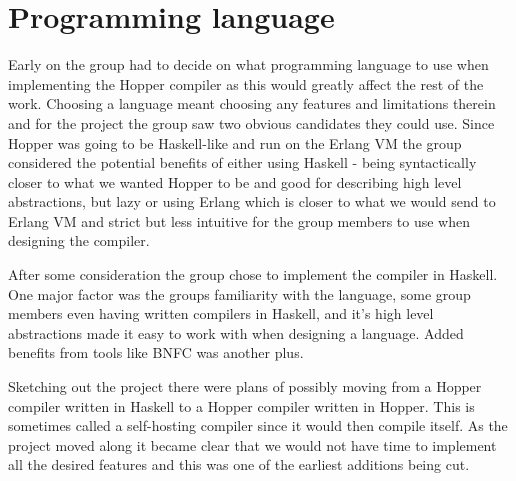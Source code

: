 \section{Programming language}




Early on the group had to decide on what programming language to use when implementing the Hopper compiler as this would greatly affect the rest of the work. Choosing a language meant choosing any features and limitations therein and for the project the group saw two obvious candidates they could use. Since Hopper was going to be Haskell-like and run on the Erlang VM the group considered the potential benefits of either using Haskell - being syntactically closer to what we wanted Hopper to be and good for describing high level abstractions, but lazy or using Erlang which is closer to what we would send to Erlang VM and strict but less intuitive for the group members to use when designing the compiler.


After some consideration the group chose to implement the compiler in Haskell. One major factor was the groups familiarity with the language, some group members even having written compilers in Haskell, and it's high level abstractions made it easy to work with when designing a language. Added benefits from tools like BNFC was another plus.

Sketching out the project there were plans of possibly moving from a Hopper compiler written in Haskell to a Hopper compiler written in Hopper. This is sometimes called a self-hosting compiler since it would then compile itself. As the project moved along it became clear that we would not have time to implement all the desired features and this was one of the earliest additions being cut.
